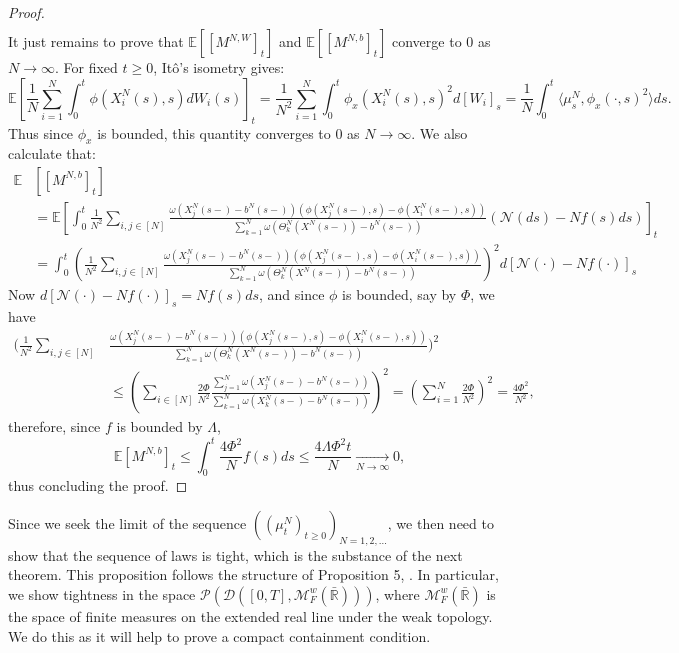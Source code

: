 \documentclass{article}
\newcommand{\B}[1]{\mathbb{#1}}
\newcommand{\C}[1]{\mathcal{#1}}
\begin{document}
\begin{proof}
\begin{align*}
    \end{align*}
    It just remains to prove that $\B{E}[[M^{N,W}]_t]$ and $\B{E}[[M^{N,b}]_t]$ converge to $0$ as $N\to\infty$. For fixed $t\geq 0$, It\^{o}'s isometry gives:
    $$\B{E}\left[ \frac1N \sum_{i=1}^N \int_0^t \phi(X_i^N(s),s)dW_i(s)\right]_t = \frac{1}{N^2}\sum_{i=1}^N \int_0^t \phi_x(X_i^N(s),s)^2 d[W_i]_s = \frac1N \int_0^t \langle \mu_s^N, \phi_x(\cdot,s)^2\rangle ds.$$
    Thus since $\phi_x$ is bounded, this quantity converges to $0$ as $N\to\infty$. We also calculate that:
    \begin{align*}
        \B{E}&[[M^{N,b}]_t] \\
        &=   \B{E}\left[\int_0^t \frac{1}{N^2}\sum_{i,j\in[N]}\frac{\omega(X_j^N(s-)-b^N(s-))(\phi(X_j^N(s-),s)-\phi(X_i^N(s-),s))}{\sum_{k=1}^N \omega(\Theta^N_k(X^N(s-))-b^N(s-))}(\C{N}(ds)-Nf(s)ds)\right]_t \\
        &= \int_0^t \left(\frac{1}{N^2}\sum_{i,j\in[N]}\frac{\omega(X_j^N(s-)-b^N(s-))(\phi(X_j^N(s-),s)-\phi(X_i^N(s-),s))}{\sum_{k=1}^N\omega(\Theta^N_k(X^N(s-))-b^N(s-))}\right)^2 d[\C{N}(\cdot)-Nf(\cdot)]_s
    \end{align*}
    Now $d[\C{N}(\cdot)-Nf(\cdot)]_s=Nf(s)ds$, and since $\phi$ is bounded, say by $\Phi$, we have 
    \begin{align*}
        \Bigg(\frac{1}{N^2}\sum_{i,j\in[N]}&\frac{\omega(X_j^N(s-)-b^N(s-))(\phi(X_j^N(s-),s)-\phi(X_i^N(s-),s))}{\sum_{k=1}^N\omega(\Theta^N_k(X^N(s-))-b^N(s-))}\Bigg)^2 \\
        &\leq \left( \sum_{i \in [N]} \frac{2\Phi}{N^2}\frac{\sum_{j=1}^N\omega(X_j^N(s-)-b^N(s-))}{\sum_{k=1}^N \omega(X_k^N(s-)-b^N(s-))}\right)^2 = \left(\sum_{i=1}^N \frac{2\Phi}{N^2}\right)^2 = \frac{4\Phi^2}{N^2},
    \end{align*}
    therefore, since $f$ is bounded by $\Lambda$,
    $$\B{E}[M^{N,b}]_t \leq \int_0^t \frac{4\Phi^2}{N}f(s)ds \leq \frac{4\Lambda\Phi^2 t}{N} \xrightarrow[N\to\infty]{} 0,$$
    thus concluding the proof. 
\end{proof}

Since we seek the limit of the sequence $((\mu_t^N)_{t\geq 0})_{N=1,2,\ldots}$, we then need to show that the sequence of laws is tight, which is the substance of the next theorem. This proposition follows the structure of Proposition 5, \cite{me3}. In particular, we show tightness in the space $\C{P}(\C{D}([0,T],\C{M}_F^w(\bar{\B{R}})))$, where $\C{M}_F^w(\bar{\B{R}})$ is the space of finite measures on the extended real line under the weak topology. We do this as it will help to prove a compact containment condition. %
\end{document}
